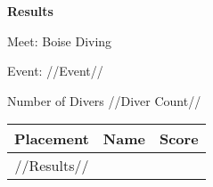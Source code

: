 \documentclass[12pt, letterpaper, landscape]{article}
\begin{document}
	\begin{center}
		\textbf{Results}
	\end{center}
	
    Meet: Boise Diving
    
    Event: //Event//

	Number of Divers //Diver Count//
	
	\begin{table}[h]
		\centering
			\begin{tabularx}{\textwidth}{|c X X|}
			Placement&Name&Score\\\midrule
            //Results//
		\end{tabularx}
	\end{table}
\end{document}
